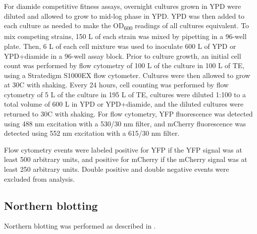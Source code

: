 For diamide competitive fitness assays, overnight cultures grown in YPD were diluted and allowed to grow to mid-log phase in YPD.
YPD was then added to each culture as needed to make the OD\textsubscript{600} readings of all cultures equivalent.
To mix competing strains, 150 \textmu L of each strain was mixed by pipetting in a 96-well plate.
Then, 6 \textmu L of each cell mixture was used to inoculate 600 \textmu L of YPD or YPD+diamide in a 96-well assay block.
Prior to culture growth, an initial cell count was performed by flow cytometry of 100 \textmu L of the culture in 100 \textmu L of TE, using a Stratedigm S1000EX flow cytometer.
Cultures were then allowed to grow at 30\textdegree C with shaking.
Every 24 hours, cell counting was performed by flow cytometry of 5 \textmu L of the culture in 195 \textmu L of TE, cultures were diluted 1:100 to a total volume of 600 \textmu L in YPD or YPD+diamide, and the diluted cultures were returned to 30\textdegree C with shaking.
For flow cytometry, YFP fluorescence was detected using 488 nm excitation with a 530/30 nm filter, and mCherry fluorescence was detected using 552 nm excitation with a 615/30 nm filter.

Flow cytometry events were labeled positive for YFP if the YFP signal was at least 500 arbitrary units, and positive for mCherry if the mCherry signal was at least 250 arbitrary units.
Double positive and double negative events were excluded from analysis.

\subsection{Northern blotting}

Northern blotting was performed as described in \citet{degennaro2013}.

\newpage

\begingroup
\singlespacing

\endgroup
